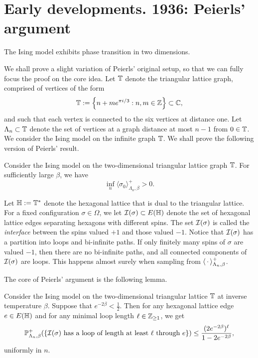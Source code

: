 \section{Early developments. 1936: Peierls' argument}
\label{sec:peierls}

\begin{theorem}[Peierls, 1936]
    \label{thm:peierls}
    The Ising model exhibits phase transition in two dimensions.
\end{theorem}

We shall prove a slight variation of Peierls' original setup,
so that we can fully focus the proof on the core idea.
Let $\mathbb T$ denote the triangular lattice graph,
comprised of vertices of the form
\[
    \mathbb T:=\left\{n+m e^{\pi i/3}:n,m\in\mathbb Z \right\}\subset\mathbb C,
\]
and such that each vertex is connected to the six
vertices at distance one.
Let $\Lambda_n\subset\mathbb T$ denote the set of vertices at a graph
distance at most $n-1$ from $0\in\mathbb T$.
We consider the Ising model on the infinite graph $\mathbb T$.
We shall prove the following version of Peierls' result.

\begin{theorem}[Peierls, 1936]
    \label{thm:peierls_triangles}
    Consider the Ising model on the two-dimensional
    triangular lattice graph $\mathbb T$.
    For sufficiently large $\beta$,
    we have
    \[
        \inf_{n}\langle\sigma_0\rangle_{\Lambda_n,\beta}^+
        >0.
    \]
\end{theorem}

Let $\mathbb H:=\mathbb T^*$ denote the hexagonal lattice
that is dual to the triangular lattice.
For a fixed configuration $\sigma\in\Omega$,
we let $\mathcal I(\sigma)\subset E(\mathbb H)$ denote the set of
hexagonal lattice edges separating hexagons with different spins.
The set $\mathcal I(\sigma)$ is called the
\emph{interface} between the spins valued $+1$
and those valued $-1$.
Notice that $\mathcal I(\sigma)$ has a partition into
loops and bi-infinite paths.
If only finitely many spins of $\sigma$ are valued $-1$,
then there are no bi-infinite paths,
and all connected components of $\mathcal I(\sigma)$
are loops.
This happens almost surely when sampling from $\langle\,\cdot\,\rangle_{\Lambda_n,\beta}^+$.

The core of Peierls' argument is the following lemma.

\begin{lemma}
    \label{lem:exp_decay_ising_loops}
    Consider the Ising model on the two-dimensional triangular lattice $\mathbb T$
    at inverse temperature $\beta$.
    Suppose that $e^{-2\beta}<\frac12$.
    Then for any hexagonal lattice edge $e\in E(\mathbb H)$
    and for any minimal loop length $\ell\in\mathbb Z_{\geq 1}$,
    we get
    \[
        \P_{\Lambda_n,\beta}^+
        (\{\text{$\calI(\sigma)$ has a loop of length at least $\ell$ through $e$}\})
        \leq \frac{(2e^{-2\beta})^\ell}{1-2e^{-2\beta}},
    \]
    uniformly in $n$.
\end{lemma}

